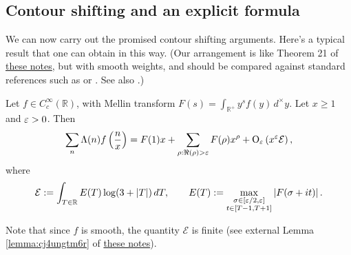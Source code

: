\documentclass[reqno]{amsart}  \numberwithin{theorem}{section} \numberwithin{equation}{section}
\begin{document}
\subsection{Contour shifting and an explicit formula}
We can now carry out the promised contour shifting arguments.  Here's a typical result that one can obtain in this way.  (Our arrangement is like Theorem 21 of \href{https://terrytao.wordpress.com/2014/12/09/254a-notes-2-complex-analytic-multiplicative-number-theory/}{these notes}, but with smooth weights, and should be compared against standard references such as \cite[Chapter 17]{Dav80} or \cite[\S5.5]{MR2061214}.  See also \cite{MR882550}.)
\begin{proposition}\label{proposition:cj541es01g}
  Let $f \in C_c^\infty(\mathbb{R})$, with Mellin transform $F(s) = \int_{\mathbb{R}^+} y^s f(y) \,d^\times y$.  Let $x \geq 1$ and $\varepsilon > 0$.  Then
  \begin{equation*}
    \sum_n \Lambda (n) f \left( \frac{n}{x} \right)
    = F(1) x + \sum_{\rho : \Re(\rho) > \varepsilon } F(\rho) x^{\rho}
    +
    \operatorname{O}_{\varepsilon} \left( x^\varepsilon \mathcal{E} \right),
  \end{equation*}
  where
  \begin{equation*}
    \mathcal{E} := \int_{T \in \mathbb{R} }
    E(T)
    \log (3 + |T|) \, d T,
    \qquad
    E(T) := 
    \max_{
      \substack{
        \sigma \in [\varepsilon/2, \varepsilon]  \\
        t \in [T-1, T+1]
      }
    }
    \left\lvert F(\sigma  + i t) \right\rvert.
  \end{equation*}
\end{proposition}
Note that since $f$ is smooth, the quantity $\mathcal{E}$ is finite (see external Lemma \ref{lemma:cj4ungtm6r} of \href{20230907T143130--fourier-and-mellin-transforms.pdf}{these notes}).
\end{document}
